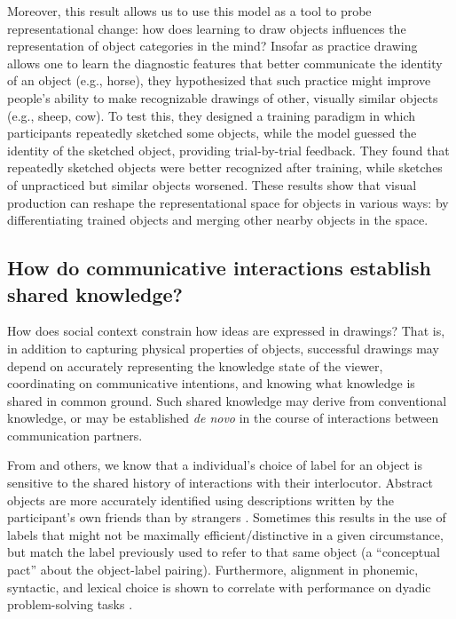 \documentclass[12pt]{article}
\begin{document}
Moreover, this result allows us to use this model as a tool to probe representational change: how does learning to draw objects influences the representation of object categories in the mind? Insofar as practice drawing allows one to learn the diagnostic features that better communicate the identity of an object (e.g., horse), they hypothesized that such practice might improve people's ability to make recognizable drawings of other, visually similar objects (e.g., sheep, cow). To test this, they designed a training paradigm in which participants repeatedly sketched some objects, while the model guessed the identity of the sketched object, providing trial-by-trial feedback. They found that repeatedly sketched objects were better recognized after training, while sketches of unpracticed but similar objects worsened. These results show that visual production can reshape the representational space for objects in various ways: by differentiating trained objects and merging other nearby objects in the space.

\subsection{How do communicative interactions establish shared knowledge?}

How does social context constrain how ideas are expressed in drawings? That is, in addition to capturing physical properties of objects, successful drawings may depend on accurately representing the knowledge state of the viewer, coordinating on communicative intentions, and knowing what knowledge is shared in common ground. Such shared knowledge may derive from conventional knowledge, or may be established \textit{de novo} in the course of interactions between communication partners.

From  and others, we know that a individual's choice of label for an object is sensitive to the shared history of interactions with their interlocutor. Abstract objects are more accurately identified using descriptions written by the participant's own friends than by strangers \cite{fussell1989understanding}. Sometimes this results in the use of labels that might not be maximally efficient/distinctive in a given circumstance, but match the label previously used to refer to that same object (a ``conceptual pact'' about the object-label pairing). Furthermore, alignment in  phonemic, syntactic, and lexical choice is shown to correlate with performance on dyadic problem-solving tasks \cite{FusaroliBahrami2012}.
\end{document}
